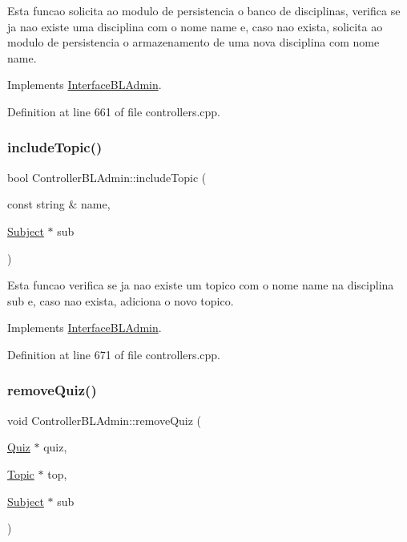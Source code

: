 Esta funcao solicita ao modulo de persistencia o banco de disciplinas, verifica se ja nao existe uma disciplina com o nome \textquotesingle{}name\textquotesingle{} e, caso nao exista, solicita ao modulo de persistencia o armazenamento de uma nova disciplina com nome \textquotesingle{}name\textquotesingle{}. 

Implements \hyperlink{class_interface_b_l_admin_aa0b718aa7b0f47adad6601c7470fb8c4}{Interface\+B\+L\+Admin}.



Definition at line 661 of file controllers.\+cpp.

\mbox{\label{class_controller_b_l_admin_abec5332aa0ecec899ea7ea814c2b2f5e}} 
\subsubsection{\texorpdfstring{include\+Topic()}{includeTopic()}}
{\footnotesize\ttfamily bool Controller\+B\+L\+Admin\+::include\+Topic (\begin{DoxyParamCaption}\item[{const string \&}]{name,  }\item[{\hyperlink{class_subject}{Subject} $\ast$}]{sub }\end{DoxyParamCaption})\hspace{0.3cm}{\ttfamily [virtual]}}

Esta funcao verifica se ja nao existe um topico com o nome \textquotesingle{}name\textquotesingle{} na disciplina sub e, caso nao exista, adiciona o novo topico. 

Implements \hyperlink{class_interface_b_l_admin_aa1d0fe6d4886260d1aa47d7bf73ad9ff}{Interface\+B\+L\+Admin}.



Definition at line 671 of file controllers.\+cpp.

\mbox{\label{class_controller_b_l_admin_ad5536394e16e953f2a68e04be748dbd3}} 
\subsubsection{\texorpdfstring{remove\+Quiz()}{removeQuiz()}}
{\footnotesize\ttfamily void Controller\+B\+L\+Admin\+::remove\+Quiz (\begin{DoxyParamCaption}\item[{\hyperlink{class_quiz}{Quiz} $\ast$}]{quiz,  }\item[{\hyperlink{class_topic}{Topic} $\ast$}]{top,  }\item[{\hyperlink{class_subject}{Subject} $\ast$}]{sub }\end{DoxyParamCaption})\hspace{0.3cm}{\ttfamily [virtual]}}



